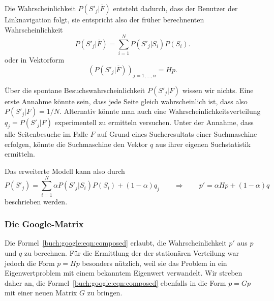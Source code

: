 Die Wahrscheinlichkeit $P(S'_j|\overline{F})$ entsteht dadurch, dass
der Benutzer der Linknavigation folgt, sie entspricht also der früher
berechnenten Wahrscheinlichkeit
\[
P(S'_j|\overline{F}) = \sum_{i=1}^N P(S'_j|S_i) P(S_i).
\]
oder in Vektorform
\[
(P(S'_j|\overline{F}))_{j=1,\dots,n}
=
Hp.
\]

Über die spontane Besuchswahrscheinlichkeit $P(S'_j|F)$ wissen wir 
nichts.
Eine erste Annahme könnte sein, dass jede Seite gleich wahrscheinlich
ist, dass also $P(S'_j|F)=1/N$.
Alternativ könnte man auch eine Wahrscheinlichkeitsverteilung
$q_j = P(S'_j|F)$ experimentell zu ermitteln versuchen.
Unter der Annahme, dass alle Seitenbesuche im Falle $F$ auf Grund
eines Sucheresultats einer Suchmaschine erfolgen, könnte die
Suchmaschine den Vektor $q$ aus ihrer eigenen Suchstatistik ermitteln.

Das erweiterte Modell kann also durch
\begin{equation}
P(S'_j)
=
\sum_{i=1}^N
\alpha P(S'_j|S_i) P(S_i)
+
(1-\alpha) q_j
\qquad\Rightarrow\qquad
p'
=
\alpha Hp
+
(1-\alpha)q
\label{buch:google:eqn:composed}
\end{equation}
beschrieben werden.

\subsubsection{Die Google-Matrix}
Die Formel~\eqref{buch:google:eqn:composed} erlaubt, die Wahrscheinlichkeit
$p'$ aus $p$ und $q$ zu berechnen.
Für die Ermittlung der der stationären Verteilung war jedoch die Form
$p=Hp$ besonders nützlich, weil sie das Problem in ein Eigenwertproblem
mit einem bekanntem Eigenwert verwandelt.
Wir streben daher an, die Formel~\eqref{buch:google:eqn:composed}
ebenfalls in die Form $p=Gp$ mit einer neuen Matrix $G$ zu bringen.

